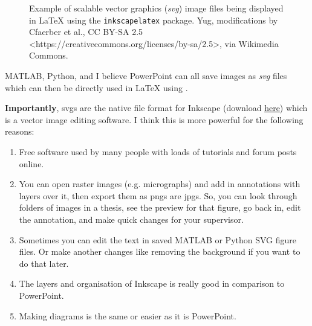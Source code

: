 \begin{figure}[!ht]
    \centering
    
    \caption{Example of scalable vector graphics (\textit{svg}) image files being displayed in \LaTeX{} using the \texttt{inkscapelatex} package. Yug, modifications by Cfaerber et al., CC BY-SA 2.5 <https://creativecommons.org/licenses/by-sa/2.5>, via Wikimedia Commons.}
    \label{fig: svg example}
\end{figure}

MATLAB, Python, and I believe PowerPoint can all save images as \textit{svg} files which can then be directly used in \LaTeX{} using \verb||.

\textbf{Importantly}, svgs are the native file format for Inkscape (download \href{https://inkscape.org/}{here}) which is a vector image editing software. I think this is more powerful for the following reasons:
\begin{enumerate}
    \item Free software used by many people with loads of tutorials and forum posts online. 
    \item You can open raster images (e.g. micrographs) and add in annotations with layers over it, then export them as pngs are jpgs. So, you can look through folders of images in a thesis, see the preview for that figure, go back in, edit the annotation, and make quick changes for your supervisor.
    \item Sometimes you can edit the text in saved MATLAB or Python SVG figure files. Or make another changes like removing the background if you want to do that later.
    \item The layers and organisation of Inkscape is really good in comparison to PowerPoint.
    \item Making diagrams is the same or easier as it is PowerPoint.
\end{enumerate}

